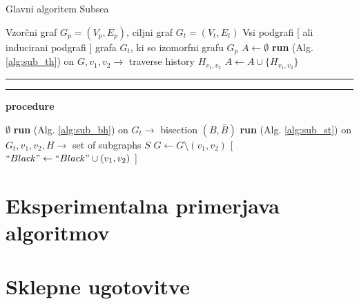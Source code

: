 \documentclass[a4paper, 12pt, ]{book}
\newcommand\Subalg[1]{%
	\Statex%
	\vspace*{-.7\baselineskip}%
	\hspace*{\dimexpr-\algorithmicindent-4pt\relax}%
	\rule{\textwidth}{0.4pt}%
	\Statex%
	
	\vspace*{-.7\baselineskip}%
	\Statex\hspace*{\dimexpr-\algorithmicindent-2pt\relax}%
	\rule{\textwidth}{0.4pt}%
	
	\Statex\hspace*{-\algorithmicindent}\textbf{procedure} #1%
}
\newcommand{\refalg}[1]{(Alg. \ref{#1})}
\begin{document}
\begin{algorithm}
\caption{Glavni algoritem Subsea}
\label{alg:sub_main}
\begin{algorithmic}[1]
	\Require Vzorčni graf $G_p = (V_p, E_p)$, ciljni graf $G_t = (V_t, E_t)$
	\Ensure Vsi podgrafi [ ali inducirani podgrafi ] grafa $G_t$, ki so izomorfni grafu $G_p$
	 \State $A \gets \emptyset$
	 	\State \textbf{run} \refalg{alg:sub_th} on $G, v_1, v_2 \to $ traverse history $H_{v_1, v_2}$
	 	\State $A \gets A \cup \{ H_{v_1, v_2} \}$
	 \EndFor
	 \State {}

	
	\Subalg{\Call{SubIso}{$A, G_t$}}
		\Return $\emptyset$
	\EndIf
	\State \textbf{run} \refalg{alg:sub_bh} on $G_t \to$ bisection $(B, \bar B)$
			\State \textbf{run} \refalg{alg:sub_st} on $G_t, v_1, v_2, H \to $ set of subgraphs $S$
			\State $G \gets G \setminus (v_1, v_2)$ [ $``Black" \gets ``Black" \cup (v_1, v_2)$ ]
		\EndFor
	\EndFor
	\State {}
			
\end{algorithmic}
\end{algorithm}


\chapter{Eksperimentalna primerjava algoritmov}
	\section{}

\chapter{Sklepne ugotovitve}
\end{document}
